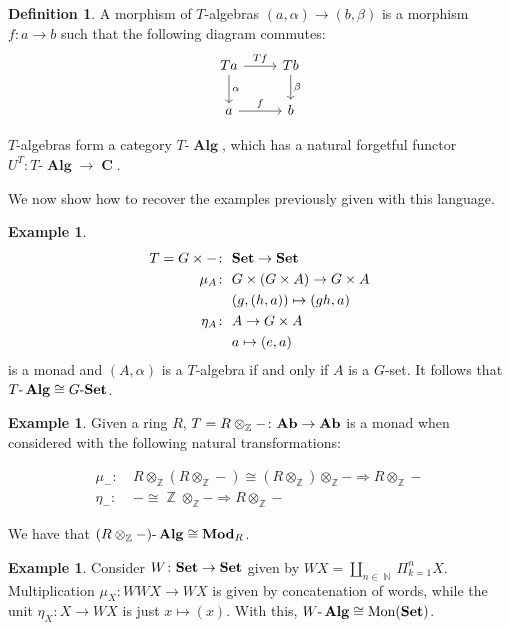 \documentclass[a4paper,11pt,twoside, openany]{book}
\newcommand{\catname}[1]{{\normalfont\textbf{#1}}}
\DeclareMathOperator{\Alg}{\mathbf{Alg}}
\newcommand{\Set}{\catname{Set}}
\newcommand{\Ab}{\catname{Ab}}
\newcommand{\RMod}{\catname{Mod}_R}
\DeclareMathOperator{\C}{\mathbf{C}}
\DeclareMathOperator{\N}{\mathbb{N}}
\DeclareMathOperator{\Z}{\mathbb{Z}}
\theoremstyle{definition}
\theoremstyle{definition}
\newtheorem{defn}[thm]{Definition} %
\newtheorem{exmp}[thm]{Example} %
\theoremstyle{remark}
\begin{document}
	\begin{defn}
		A morphism of $T$-algebras $(a,\alpha)\rightarrow (b,\beta)$ is a morphism $f\colon a\rightarrow b$ such that the following diagram commutes:
		\[
			\begin{tikzcd}
				Ta\arrow["\alpha"]{d}\arrow["Tf"]{r}
				& Tb\arrow["\beta"]{d} \\
				a\arrow["f"]{r}
				& b
			\end{tikzcd}
		\]
	\end{defn}

		
	$T$-algebras form a category $T\mbox{-}\Alg$, which has a natural forgetful functor $U^T\colon T\mbox{-}\Alg\rightarrow\C$.
	
	We now show how to recover the examples previously given with this language.
	
	\begin{exmp}
		\begin{align*}
			T=G\times - \colon&\ \Set \rightarrow\Set \\
			\mu_A\colon&\ G\times (G\times A) \rightarrow G\times A \\
			&\ (g,(h,a)) \mapsto (gh,a) \\
			\eta_A\colon&\ A \rightarrow G\times A \\
			&\ a \mapsto (e,a)
		\end{align*}
		is a monad and $(A,\alpha)$ is a $T$-algebra if and only if $A$ is a $G$-set. It follows that $T\mbox{-}\Alg\cong G\mbox{-}\Set$.
	\end{exmp}

	\begin{exmp}
		Given a ring $R$, $T=R\otimes_{\Z}-\colon \Ab\rightarrow \Ab$ is a monad when considered with the following natural transformations:
		
		\begin{align*}
			\mu_{-}\colon &\ R\otimes_{\Z}(R\otimes_{\Z}-)\cong (R\otimes_{\Z})\otimes_{\Z}-\Rightarrow R\otimes_{\Z}- \\
			\eta_-\colon &\ -\cong\Z\otimes_{\Z}-\Rightarrow R\otimes_{\Z}-
		\end{align*}
	
		We have that $(R\otimes_{\Z}-)\mbox{-}\Alg\cong \RMod$.
	\end{exmp}

	\begin{exmp}
		Consider $W\colon\Set\rightarrow\Set$ given by $WX=\amalg_{n\in\N}\Pi_{k=1}^n X$. Multiplication $\mu_X\colon WWX\rightarrow WX$ is given by concatenation of words, while the unit $\eta_X\colon X\rightarrow WX$ is just $x\mapsto (x)$. With this, $W\mbox{-}\Alg\cong \text{Mon}(\Set)$.
	\end{exmp}
\end{document}
